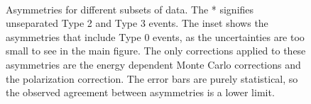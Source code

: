 \begin{figure}[h]
  \centering
   \\
  \caption{Asymmetries for different subsets of data. The * signifies unseparated Type 2 and Type 3 events.
    The inset shows the asymmetries that include Type 0 events, as the uncertainties
    are too small to see in the main figure. The only corrections applied to these asymmetries are
    the energy dependent Monte Carlo corrections and the polarization correction. The error bars are
    purely statistical, so the observed agreement between asymmetries is a lower limit.}
  \label{fig:anaChAsymms}
\end{figure}

